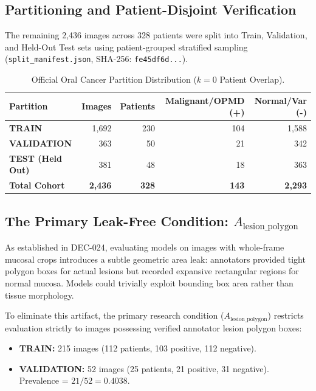 \documentclass[11pt,a4paper]{report}
\newcommand{\artifact}[1]{\nolinkurl{#1}}
\begin{document}
\subsection{Partitioning and Patient-Disjoint Verification}
The remaining 2,436 images across 328 patients were split into Train, Validation, and Held-Out Test sets using patient-grouped stratified sampling (\artifact{split\_manifest.json}, SHA-256: \texttt{fe45df6d...}).
\begin{table}[H]
\centering
\small
\begin{tabular}{lrrrr}
\toprule
\textbf{Partition} & \textbf{Images} & \textbf{Patients} & \textbf{Malignant/OPMD (+)} & \textbf{Normal/Var (-)} \\
\midrule
\textbf{TRAIN} & 1,692 & 230 & 104 & 1,588 \\
\textbf{VALIDATION} & 363 & 50 & 21 & 342 \\
\textbf{TEST (Held Out)} & 381 & 48 & 18 & 363 \\
\midrule
\textbf{Total Cohort} & \textbf{2,436} & \textbf{328} & \textbf{143} & \textbf{2,293} \\
\bottomrule
\end{tabular}
\caption{Official Oral Cancer Partition Distribution ($k=0$ Patient Overlap).}
\label{tab:oral_partitions}
\end{table}

\subsection{The Primary Leak-Free Condition: $A_\text{lesion\_polygon}$}
As established in DEC-024, evaluating models on images with whole-frame mucosal crops introduces a subtle geometric area leak: annotators provided tight polygon boxes for actual lesions but recorded expansive rectangular regions for normal mucosa. Models could trivially exploit bounding box area rather than tissue morphology. 

To eliminate this artifact, the primary research condition ($A_\text{lesion\_polygon}$) restricts evaluation strictly to images possessing verified annotator lesion polygon boxes:
\begin{itemize}
  \item \textbf{TRAIN:} 215 images (112 patients, 103 positive, 112 negative).
  \item \textbf{VALIDATION:} 52 images (25 patients, 21 positive, 31 negative). Prevalence = $21/52 = 0.4038$.
\end{itemize}
\end{document}
